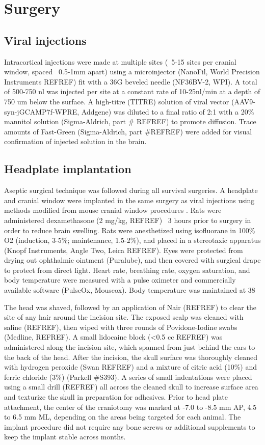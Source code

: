 \section{Surgery}
\subsection{Viral injections}
Intracortical injections were made at multiple sites (~5-15 sites per cranial window, spaced ~0.5-1mm apart) using a microinjector (NanoFil, World Precision Instruments REFREF) fit with a 36G beveled needle (NF36BV-2, WPI). A total of 500-750 nl was injected per site at a constant rate of 10-25nl/min at a depth of 750 um below the surface. A high-titre (TITRE) solution of viral vector (AAV9-syn-jGCAMP7f-WPRE, Addgene) was diluted to a final ratio of 2:1 with a 20\% mannitol solution (Sigma-Aldrich, part # REFREF) to promote diffusion. Trace amounts of Fast-Green (Sigma-Aldrich, part #REFREF) were added for visual confirmation of injected solution in the brain.

\subsection{Headplate implantation}
Aseptic surgical technique was followed during all survival surgeries. A headplate and cranial window were implanted in the same surgery as viral injections using methods modified from mouse cranial window procedures \cite{Goldey2014}. Rats were administered dexamethasone (2 mg/kg, REFREF) ~3 hours prior to surgery in order to reduce brain swelling. Rats were anesthetized using isofluorane in 100\% O2 (induction, 3-5\%; maintenance, 1.5-2\%), and placed in a stereotaxic apparatus (Knopf Instruments, Angle Two, Leica REFREF). Eyes were protected from drying out ophthalmic ointment (Puralube), and then covered with surgical drape to protect from direct light. Heart rate, breathing rate, oxygen saturation, and body temperature were measured with a pulse oximeter and commercially available software (PulseOx, Mouseox). Body temperature was maintained at 38%

The head was shaved, followed by an application of Nair (REFREF) to clear the site of any hair around the incision site. The exposed scalp was cleaned with saline (REFREF), then wiped with three rounds of Povidone-Iodine swabs (Medline, REFREF). A small lidocaine block (<0.5 cc REFREF) was administered along the incision site, which spanned from just behind the ears to the back of the head. After the incision, the skull surface was thoroughly cleaned with hydrogen peroxide (Swan REFREF) and a mixture of citric acid (10\%) and ferric chloride (3\%) (Parkell #S393). A series of small indentations were placed using a small drill (REFREF) all across the cleaned skull to increase surface area and texturize the skull in preparation for adhesives. Prior to head plate attachment, the center of the craniotomy was marked at -7.0 to -8.5 mm AP, 4.5 to 6.5 mm ML, depending on the areas being targeted for each animal. The implant procedure did not require any bone screws or additional supplements to keep the implant stable across months. 


